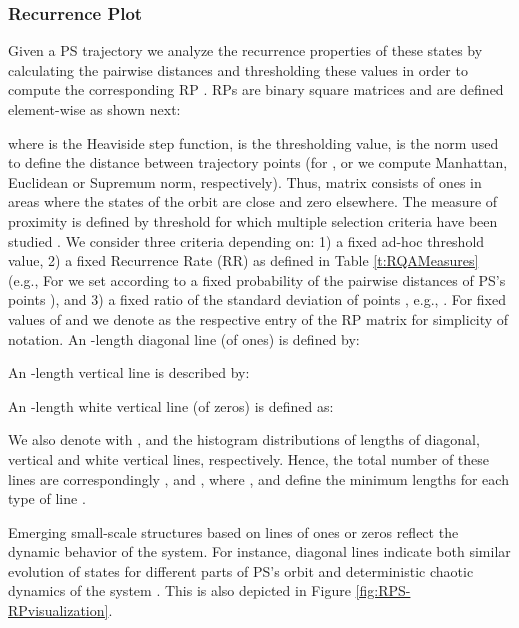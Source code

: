\documentclass[a4paper]{article}
\begin{document}
\subsubsection{Recurrence Plot}
\label{sect: Recurrence Plot Computation}
Given a PS trajectory  we analyze the recurrence properties of these states by calculating the pairwise distances and thresholding these values in order to compute the corresponding RP \cite{RPsfirst1987}. RPs are binary square matrices and are defined element-wise as shown next:

where  is the Heaviside step function,  is the thresholding value,  is the norm used to define the distance between trajectory points (for ,  or  we compute Manhattan, Euclidean or Supremum norm, respectively). Thus, matrix  consists of ones in areas where the states of the orbit are close and zero elsewhere. The measure of proximity is defined by threshold  for which multiple selection criteria have been studied \cite{schinkel2008eselection}. We consider three criteria depending on: 1) a fixed ad-hoc threshold value, 2) a fixed Recurrence Rate (RR) as defined in Table \ref{t:RQAMeasures} (e.g., For  we set  according to a fixed probability of the pairwise distances of PS's points ), and 3) a fixed ratio of the standard deviation  of points , e.g.,  \cite{stdEselection}. For fixed values of  and  we denote as  the respective entry of the RP matrix for simplicity of notation. \newline
An -length diagonal line (of ones) is defined by: 

An -length vertical line is described by:  

An -length white vertical line (of zeros) is defined as:  

We also denote with ,  and  the histogram distributions of lengths of diagonal, vertical and white vertical lines, respectively. Hence, the total number of these lines are correspondingly ,  and , where ,  and  define the minimum lengths for each type of line \cite{marwan2007recurrenceAll}. 

Emerging small-scale structures based on lines of ones or zeros reflect the dynamic behavior of the system. For instance, diagonal lines indicate both similar evolution of states for different parts of PS's orbit and  deterministic chaotic dynamics of the system \cite{marwan2007recurrenceAll}. This is also depicted in Figure \ref{fig:RPS-RPvisualization}. 
\end{document}
